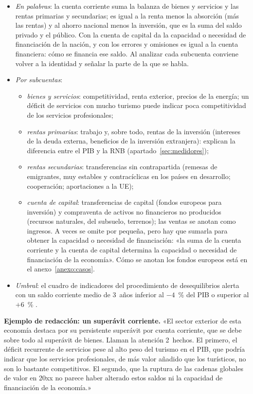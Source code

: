 \documentclass[11pt]{article}
\begin{document}
\begin{itemize}
\item \emph{En palabras}: la cuenta corriente suma la balanza de bienes y servicios y las rentas primarias y secundarias; es igual a la renta menos la absorción (más las rentas) y al ahorro nacional menos la inversión, que es la suma del saldo privado y el público. Con la cuenta de capital da la capacidad o necesidad de financiación de la nación, y con los errores y omisiones es igual a la cuenta financiera: cómo se financia ese saldo. Al analizar cada subcuenta conviene volver a la identidad y señalar la parte de la que se habla.
\item \emph{Por subcuentas}:
  \begin{itemize}
  \item \emph{bienes y servicios}: competitividad, renta exterior, precios de la energía; un déficit de servicios con mucho turismo puede indicar poca competitividad de los servicios profesionales;
  \item \emph{rentas primarias}: trabajo y, sobre todo, rentas de la inversión (intereses de la deuda externa, beneficios de la inversión extranjera): explican la diferencia entre el PIB y la RNB (apartado~\ref{sec:medidores});
  \item \emph{rentas secundarias}: transferencias sin contrapartida (remesas de emigrantes, muy estables y contracíclicas en los países en desarrollo; cooperación; aportaciones a la UE);
  \item \emph{cuenta de capital}: transferencias de capital (fondos europeos para inversión) y compraventa de activos no financieros no producidos (recursos naturales, del subsuelo, terrenos); las ventas se anotan como ingresos. A veces se omite por pequeña, pero hay que sumarla para obtener la capacidad o necesidad de financiación: «la suma de la cuenta corriente y la cuenta de capital determina la capacidad o necesidad de financiación de la economía». Cómo se anotan los fondos europeos está en el anexo~\ref{anexo:casos}.
  \end{itemize}
\item \emph{Umbral}: el cuadro de indicadores del procedimiento de desequilibrios alerta con un saldo corriente medio de 3~años inferior al $-4$~\% del PIB o superior al $+6$~\% \parencite{CE2025AMR2026}.
\end{itemize}

\begin{anotaciones}
\textbf{Ejemplo de redacción: un superávit corriente.}
«El sector exterior de esta economía destaca por su persistente superávit por cuenta corriente, que se debe sobre todo al superávit de bienes. Llaman la atención 2~hechos. El primero, el déficit recurrente de servicios pese al alto peso del turismo en el PIB, que podría indicar que los servicios profesionales, de más valor añadido que los turísticos, no son lo bastante competitivos. El segundo, que la ruptura de las cadenas globales de valor en 20xx no parece haber alterado estos saldos ni la capacidad de financiación de la economía.»
\end{anotaciones}
\end{document}
